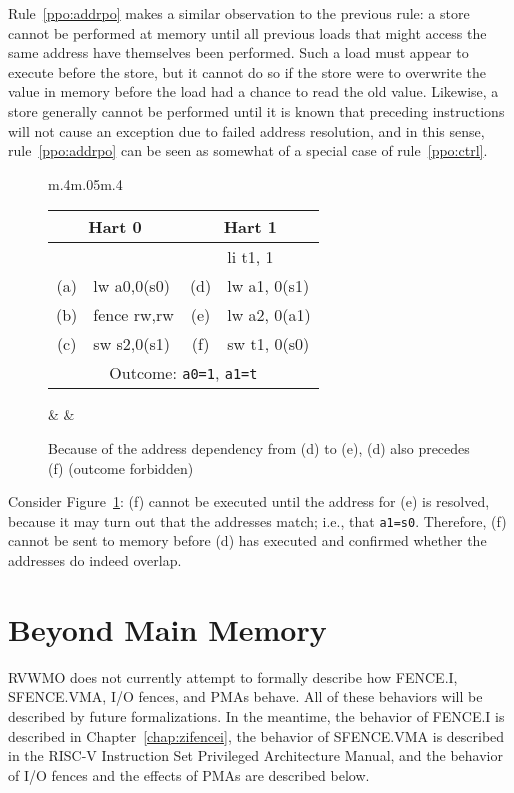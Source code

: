 Rule~\ref{ppo:addrpo} makes a similar observation to the previous rule: a store cannot be performed at memory until all previous loads that might access the same address have themselves been performed.
Such a load must appear to execute before the store, but it cannot do so if the store were to overwrite the value in memory before the load had a chance to read the old value.
Likewise, a store generally cannot be performed until it is known that preceding instructions will not cause an exception due to failed address resolution, and in this sense, rule~\ref{ppo:addrpo} can be seen as somewhat of a special case of rule~\ref{ppo:ctrl}.

\begin{figure}[h!]
  \centering
  \begin{tabular}{m{.4\linewidth}m{.05\linewidth}m{.4\linewidth}}
    \tt\small
    \begin{tabular}{cl||cl}
    \multicolumn{2}{c}{Hart 0} & \multicolumn{2}{c}{Hart 1} \\
    \hline
        &             &     & li t1, 1       \\
    (a) & lw a0,0(s0) & (d) & lw a1, 0(s1)   \\
    (b) & fence rw,rw & (e) & lw a2, 0(a1)   \\
    (c) & sw s2,0(s1) & (f) & sw t1, 0(s0)   \\
    \hline
    \multicolumn{4}{c}{Outcome: {\tt a0=1}, {\tt a1=t}}
    \end{tabular}  
    & &
    
  \end{tabular}
  \caption{Because of the address dependency from (d) to (e), (d) also precedes (f) (outcome forbidden)}
  \label{fig:litmus:addrpo}
\end{figure}

Consider Figure~\ref{fig:litmus:addrpo}:
(f) cannot be executed until the address for (e) is resolved, because it may turn out that the addresses match; i.e., that {\tt a1=s0}.  Therefore, (f) cannot be sent to memory before (d) has executed and confirmed whether the addresses do indeed overlap.


\section{Beyond Main Memory}

RVWMO does not currently attempt to formally describe how FENCE.I, SFENCE.VMA, I/O fences, and PMAs behave.
All of these behaviors will be described by future formalizations.
In the meantime, the behavior of FENCE.I is described in Chapter~\ref{chap:zifencei}, the behavior of SFENCE.VMA is described in the RISC-V Instruction Set Privileged Architecture Manual, and the behavior of I/O fences and the effects of PMAs are described below.

